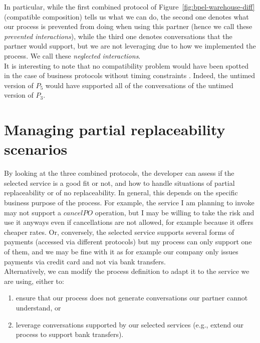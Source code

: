 In particular, while the first combined protocol of  Figure~\ref{fig:bpel-warehouse-diff} (compatible composition) tells us what we can do, the second one denotes what our process is prevented from doing when using this partner (hence we call these \emph{prevented interactions}), while the third one denotes conversations that the partner would support, but we are not leveraging due to how we implemented the process. We call these \emph{neglected interactions}.\\

It is interesting to note that no compatibility problem would have been spotted in the case of business protocols without timing constraints \cite{FTBB}. Indeed, the untimed version of $P_5$ would have supported all of the conversations of the untimed version of $P_3$.


\section{Managing partial replaceability scenarios}


By looking at the three combined protocols, the developer can assess if the selected service is a good fit or not, and how to handle situations of partial replaceability or of no replaceability.
In general, this depends on the specific business purpose of the process. For example, the service I am planning to invoke may not support a $cancelPO$  operation, but I may be willing to take the risk and use it anyways even if cancellations are not allowed, for example because it offers cheaper rates.
Or, conversely, the selected service supports several forms of payments (accessed via different protocols) but my process can only support one of them, and we may be fine with it as for example our company only issues payments via credit card and not via bank transfers.\\

Alternatively, we can modify the process definition to adapt it to the service we are using, either to:
\begin{enumerate}
  
  \item ensure that our process does not generate conversations our partner cannot understand, or
  
  \item leverage conversations supported by our selected services (e.g., extend our process to support bank transfers).
  
\end{enumerate}

